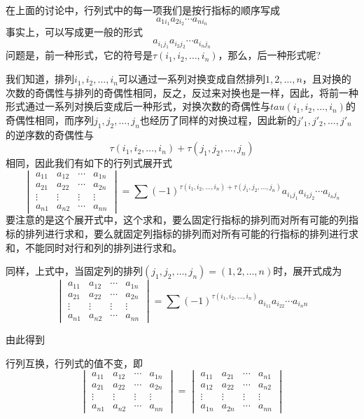 在上面的讨论中，行列式中的每一项我们是按行指标的顺序写成
\[ a_{1i_1}a_{2i_2}\cdots a_{ni_n} \]
事实上，可以写成更一般的形式
\[ a_{i_1j_1}a_{i_2j_2}\cdots a_{i_nj_n} \]
问题是，前一种形式，它的符号是$\tau(i_1,i_2,\ldots,i_n)$，那么，后一种形式呢?

我们知道，排列$i_1,i_2,\ldots,i_n$可以通过一系列对换变成自然排列$1,2,\ldots,n$，且对换的次数的奇偶性与排列的奇偶性相同，反之，反过来对换也是一样，因此，将前一种形式通过一系列对换后变成后一种形式，对换次数的奇偶性与$tau(i_1,i_2,\ldots,i_n)$的奇偶性相同，而序列$j_1,j_2,\ldots,j_n$也经历了同样的对换过程，因此新的$j'_1,j'_2,\ldots,j'_n$的逆序数的奇偶性与
\[ \tau(i_1,i_2,\ldots,i_n)+\tau(j_1,j_2,\ldots,j_n) \]
相同，因此我们有如下的行列式展开式
  \[
  \begin{vmatrix}
    a_{11} & a_{12} & \cdots & a_{1n} \\
    a_{21} & a_{22} & \cdots & a_{2n} \\
    \vdots & \vdots & \vdots & \vdots \\
    a_{n1} & a_{n2} & \cdots & a_{nn}
  \end{vmatrix}
  = \sum (-1)^{\tau(i_1,i_2,\ldots,i_n)+\tau(j_1,j_2,\ldots,j_n)} a_{i_1j_1}a_{i_2j_2}\cdots a_{i_nj_n}
\]
要注意的是这个展开式中，这个求和，要么固定行指标的排列而对所有可能的列指标的排列进行求和，要么就固定列指标的排列而对所有可能的行指标的排列进行求和，不能同时对行和列的排列进行求和。

同样，上式中，当固定列的排列$(j_1,j_2,\ldots,j_n) = (1,2,\ldots,n)$时，展开式成为
  \[
  \begin{vmatrix}
    a_{11} & a_{12} & \cdots & a_{1n} \\
    a_{21} & a_{22} & \cdots & a_{2n} \\
    \vdots & \vdots & \vdots & \vdots \\
    a_{n1} & a_{n2} & \cdots & a_{nn}
  \end{vmatrix}
  = \sum (-1)^{\tau(i_1,i_2,\ldots,i_n)} a_{i_11}a_{i_22}\cdots a_{i_nn}
\]

由此得到
\begin{property}
  行列互换，行列式的值不变，即
  \[
  \begin{vmatrix}
    a_{11} & a_{12} & \cdots & a_{1n} \\
    a_{21} & a_{22} & \cdots & a_{2n} \\
    \vdots & \vdots & \vdots & \vdots \\
    a_{n1} & a_{n2} & \cdots & a_{nn}
  \end{vmatrix}
  = 
  \begin{vmatrix}
    a_{11} & a_{21} & \cdots & a_{n1} \\
    a_{12} & a_{22} & \cdots & a_{n2} \\
    \vdots & \vdots & \vdots & \vdots \\
    a_{1n} & a_{2n} & \cdots & a_{nn}
  \end{vmatrix}
\]
\end{property}

